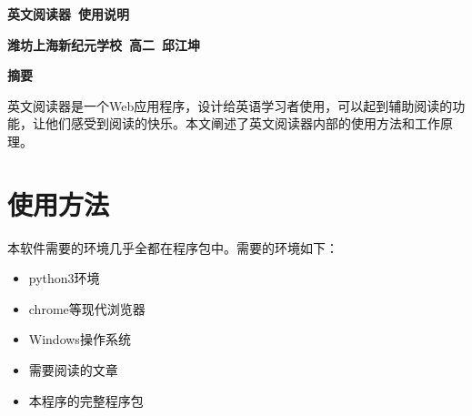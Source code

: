 \documentclass[a4paper, 11pt， oneside]{article}
\author{邱江坤}
\begin{document}


\begin{titlepage}
\begin{center}\textbf{英文阅读器\ 使用说明}\end{center}
\begin{center}\textbf{潍坊上海新纪元学校\ 高二\ 邱江坤}\end{center}

\end{titlepage}

\noindent{}\begin{center}\textbf{摘要}\quad{}\end{center}
    英文阅读器是一个Web应用程序，设计给英语学习者使用，可以起到辅助阅读的功能，让他们感受到阅读的快乐。本文阐述了英文阅读器内部的使用方法和工作原理。
\newpage
\tableofcontents
\newpage
\section{使用方法}
    本软件需要的环境几乎全都在程序包中。需要的环境如下：

    \begin{itemize}
        \item  python3环境
        \item  chrome等现代浏览器
        \item  Windows操作系统
        \item  需要阅读的文章
        \item  本程序的完整程序包
    \end{itemize}
\end{document}
